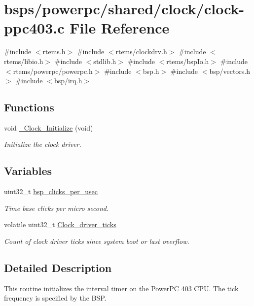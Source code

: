 \hypertarget{clock-ppc403_8c}{}\section{bsps/powerpc/shared/clock/clock-\/ppc403.c File Reference}
\label{clock-ppc403_8c}
{\ttfamily \#include $<$rtems.\+h$>$}\newline
{\ttfamily \#include $<$rtems/clockdrv.\+h$>$}\newline
{\ttfamily \#include $<$rtems/libio.\+h$>$}\newline
{\ttfamily \#include $<$stdlib.\+h$>$}\newline
{\ttfamily \#include $<$rtems/bsp\+Io.\+h$>$}\newline
{\ttfamily \#include $<$rtems/powerpc/powerpc.\+h$>$}\newline
{\ttfamily \#include $<$bsp.\+h$>$}\newline
{\ttfamily \#include $<$bsp/vectors.\+h$>$}\newline
{\ttfamily \#include $<$bsp/irq.\+h$>$}\newline
\subsection*{Functions}
\begin{DoxyCompactItemize}
\item 
void \mbox{\hyperlink{group__RTEMSDriverClock_gafddd4d0e38336d3fbc84b05d0dcd5cbe}{\+\_\+\+Clock\+\_\+\+Initialize}} (void)
\begin{DoxyCompactList}\small\item\em Initialize the clock driver. \end{DoxyCompactList}\end{DoxyCompactItemize}
\subsection*{Variables}
\begin{DoxyCompactItemize}
\item 
uint32\+\_\+t \mbox{\hyperlink{group__RTEMSBSPsPowerPCGen83XX_gabfae404b02d5b3193b9420930d97d84a}{bsp\+\_\+clicks\+\_\+per\+\_\+usec}}
\begin{DoxyCompactList}\small\item\em Time base clicks per micro second. \end{DoxyCompactList}\item 
volatile uint32\+\_\+t \mbox{\hyperlink{group__RTEMSDriverClock_ga154adab6b69d3a14e921cfe8b2649d20}{Clock\+\_\+driver\+\_\+ticks}}
\begin{DoxyCompactList}\small\item\em Count of clock driver ticks since system boot or last overflow. \end{DoxyCompactList}\end{DoxyCompactItemize}


\subsection{Detailed Description}
This routine initializes the interval timer on the Power\+PC 403 C\+PU. The tick frequency is specified by the B\+SP. 
